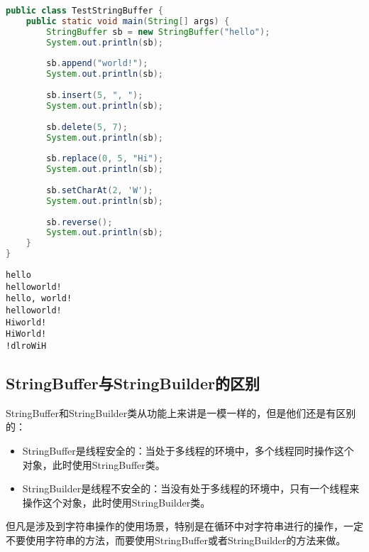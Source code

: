 
\begin{lstlisting}[language=Java]
public class TestStringBuffer {
    public static void main(String[] args) {
        StringBuffer sb = new StringBuffer("hello");
        System.out.println(sb);
        
        sb.append("world!");
        System.out.println(sb);
        
        sb.insert(5, ", ");
        System.out.println(sb);
        
        sb.delete(5, 7);
        System.out.println(sb);
        
        sb.replace(0, 5, "Hi");
        System.out.println(sb);
        
        sb.setCharAt(2, 'W');
        System.out.println(sb);
        
        sb.reverse();
        System.out.println(sb);
    }
}
\end{lstlisting}

\begin{tcolorbox}
	\begin{verbatim}
hello
helloworld!
hello, world!
helloworld!
Hiworld!
HiWorld!
!dlroWiH
	\end{verbatim}
\end{tcolorbox}

\vspace{0.5cm}

\subsection{StringBuffer与StringBuilder的区别}

StringBuffer和StringBuilder类从功能上来讲是一模一样的，但是他们还是有区别的：

\begin{itemize}
	\item StringBuffer是线程安全的：当处于多线程的环境中，多个线程同时操作这个对象，此时使用StringBuffer类。

	\item StringBuilder是线程不安全的：当没有处于多线程的环境中，只有一个线程来操作这个对象，此时使用StringBuilder类。
\end{itemize}

但凡是涉及到字符串操作的使用场景，特别是在循环中对字符串进行的操作，一定不要使用字符串的方法，而要使用StringBuffer或者StringBuilder的方法来做。\\

